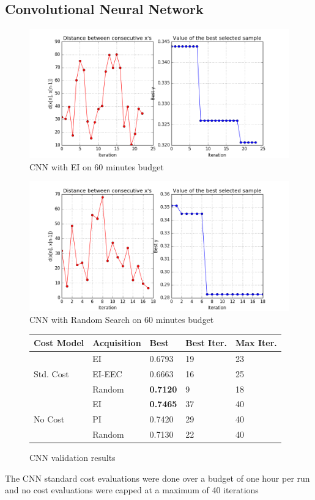 \documentclass[letterpaper]{article}
\begin{document}
\subsection {Convolutional Neural Network}
\begin{figure}[!h]
	\includegraphics[width=\linewidth]{EIX_CNN_X_init2_STD_ITER60min_v2.png}
	\caption{CNN with EI on 60 minutes budget}
\end{figure}
\vfill\eject
\begin{figure}[!h]
	\includegraphics[width=\linewidth]{RAND_CNN_X_init2_STD_ITER60min_v2.png}
	\caption{CNN with Random Search on 60 minutes budget}
\end{figure}
\begin{figure}[!h]
\begin{center}
	\begin{tabular}{lllll}
		\hline
		Cost Model & Acquisition & Best & Best Iter. & Max Iter.\\
		\hline
		\multirow{3}{*}{Std. Cost} & EI &  0.6793 & 19 & 23\\
		& EI-EEC & 0.6663 & 16 & 25\\
		& Random & \textbf{0.7120} & 9 & 18\\
		\hline
		\multirow{4}{*}{No Cost} & EI & \textbf{0.7465} & 37 & 40\\
		& PI & 0.7420 & 29 & 40\\
		& Random & 0.7130 & 22 & 40\\
		\hline
	\end{tabular}
\end{center}
	\caption{CNN validation results}
\end{figure}
The CNN standard cost evaluations were done over a budget of one hour per run and no cost evaluations were capped at a maximum of 40 iterations
\end{document}
